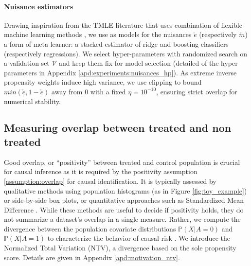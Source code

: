 \documentclass[10pt]{article}
\begin{document}
\begin{multicols}{2}
    \paragraph{Nuisance estimators}

    Drawing inspiration from the TMLE literature that uses combination of flexible
    machine learning methods \cite{schuler_targeted_2017}, we use as models
    for the nuisances $\check e$ (respectively $\check m$) a form of meta-learner: a
    stacked estimator of ridge and boosting classifiers (respectively
    regressions). We select hyper-parameters with randomized search on a validation set
    $\mathcal{V}$ and keep them fix for model selection (detailed of the hyper
    parameters in Appendix \ref{apd:experiments:nuisances_hp}). As extreme inverse
    propensity weights induce high variance, we use clipping
    \cite{swaminathan_counterfactual_2015, ionides_truncated_2008} to bound
    $min(\check e, 1-\check e)$ away from 0 with a fixed $\eta=10^{-10}$, ensuring
    strict overlap for numerical stability.




    \subsection{Measuring overlap between treated and non treated}\label{subsec:measuring_overlap}

    Good overlap, or ``positivity'' between treated and control population is
    crucial for causal inference as it is required by the positivity assumption
    \ref{assumption:overlap} for causal identification. It is typically assessed by
    qualitative methods using population histograms (as in Figure
    \ref{fig:toy_example}) or side-by-side box plots, or quantitative approaches
    such as Standardized Mean Difference
    \cite{austin_introduction_2011,austin_moving_2015}. While these methods are
    useful to decide if positivity holds, they do not summarize a dataset's overlap
    in a single measure. Rather, we compute the divergence
    between the population covariate distributions $\mathbb P(X|A=0)$ and $\mathbb
        P(X|A=1)$ to characterize the behavior of causal risk
    \cite{damour_overlap_2020,johansson_generalization_2021}. We introduce the
    Normalized Total Variation (NTV), a divergence based on the sole propensity
    score. Details are given in Appendix \ref{apd:motivation_ntv}.


\end{multicols}
\end{document}

